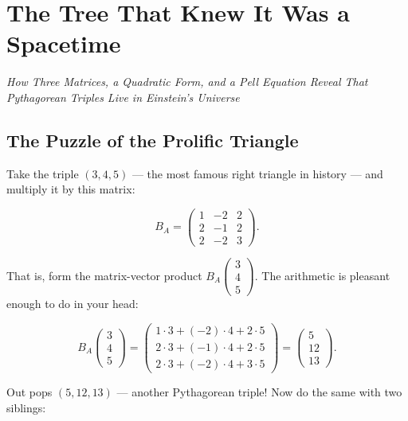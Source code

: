 \chapter{The Tree That Knew It Was a Spacetime}



\begin{center}\textit{How Three Matrices, a Quadratic Form, and a Pell Equation Reveal That Pythagorean Triples Live in Einstein's Universe}\end{center}
\bigskip


\ornbreak



\section{The Puzzle of the Prolific Triangle}


Take the triple $(3, 4, 5)$ --- the most famous right triangle in history --- and multiply it by this matrix:

\[
B_A = \begin{pmatrix} 1 & -2 & 2 \\ 2 & -1 & 2 \\ 2 & -2 & 3 \end{pmatrix}.
\]

That is, form the matrix-vector product $B_A \begin{pmatrix} 3 \\ 4 \\ 5 \end{pmatrix}$. The arithmetic is pleasant enough to do in your head:

\[
B_A \begin{pmatrix} 3 \\ 4 \\ 5 \end{pmatrix} = \begin{pmatrix} 1\cdot3 + (-2)\cdot4 + 2\cdot5 \\ 2\cdot3 + (-1)\cdot4 + 2\cdot5 \\ 2\cdot3 + (-2)\cdot4 + 3\cdot5 \end{pmatrix} = \begin{pmatrix} 5 \\ 12 \\ 13 \end{pmatrix}.
\]

Out pops $(5, 12, 13)$ --- another Pythagorean triple! Now do the same with two siblings:

